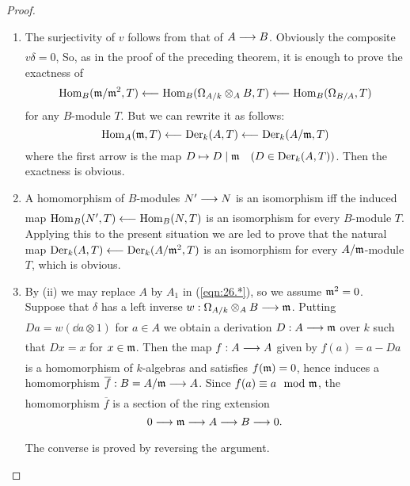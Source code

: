 \documentclass[../main]{subfiles}
\begin{document}
\begin{proof}
\begin{enumerate}
    \item The surjectivity of $v$ follows from that of $A \varrightarrow{} B$. Obviously the composite $v \delta=0$, So, as in the proof of the preceding theorem, it is enough to prove the exactness of \[\operatorname{Hom}_B(\mathfrak{m}/\mathfrak{m}^2, T)\longleftarrow\operatorname{Hom}_B(\Omega_{A / k} \otimes_A B, T)\longleftarrow\operatorname{Hom}_B(\Omega_{B / A}, T)\] for any $B$-module $T$. But we can rewrite it as follows: \[\operatorname{Hom}_A(\mathfrak{m}, T)\longleftarrow\operatorname{Der}_k(A, T)\longleftarrow\operatorname{Der}_k(A / \mathfrak{m}, T)\] where the first arrow is the map $D \mapsto D \mid \ideal{m} \for{D\in \Der_k(A, T)}$. Then the exactness is obvious.

    \item A homomorphism of $B$-modules $N' \varrightarrow{} N$ is an isomorphism iff the induced map $\operatorname{Hom}_B(N', T) \longleftarrow \operatorname{Hom}_B(N, T)$ is an isomorphism for every $B$-module $T$. Applying this to the present situation we are led to prove that the natural map $\operatorname{Der}_k(A, T)\longleftarrow \operatorname{Der}_k(A / \mathfrak{m}^2,T)$ is an isomorphism for every $A/\mathfrak{m}$-module $T$, which is obvious.

    \item By (ii) we may replace $A$ by $A_1$ in (\ref{eqn:26.*}), so we assume $\mathfrak{m}^2=0$. Suppose that $\delta$ has a left inverse $w: \Omega_{A / k} \otimes_A B \varrightarrow{} \ideal{m}$. Putting $Da =w(\dd a \otimes 1)$ for $a\in A$ we obtain a derivation $D: A\varrightarrow{} \ideal{m}$ over $k$ such that $D x=x$ for $x \in \mathfrak{m}$. Then the map $f: A \varrightarrow{} A$ given by $f(a)=a-Da$ is a homomorphism of $k$-algebras and satisfies $f(\mathfrak{m})=0$, hence induces a homomorphism $\overline{f}: B=A / \ideal{m}\varrightarrow{}A$. Since $f(a) \equiv a \mod \ideal{m}$, the homomorphism $\overline{f}$ is a section of the ring extension \[0 \varrightarrow{} \ideal{m} \varrightarrow{} A \varrightarrow{} B \varrightarrow{} 0.\] The converse is proved by reversing the argument.
\end{enumerate}
\end{proof}
\end{document}
